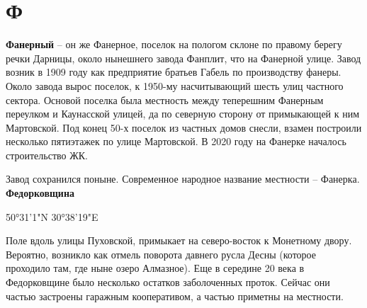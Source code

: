\chapter*{Ф}

\textbf{Фанерный} – он же Фанерное, поселок на пологом склоне по правому берегу речки Дарницы, около нынешнего завода Фанплит, что на Фанерной улице. Завод возник в 1909 году как предприятие братьев Габель по производству фанеры. Около завода вырос поселок, к 1950-му насчитывающий шесть улиц частного сектора. Основой поселка была местность между теперешним Фанерным переулком и Каунасской улицей, да по северную сторону от примыкающей к ним Мартовской. Под конец 50-х поселок из частных домов снесли, взамен построили несколько пятиэтажек по улице Мартовской. В 2020 году на Фанерке началось строительство ЖК.

Завод сохранился поныне. Современное народное название местности – Фанерка.\\

\textbf{Федорковщина}

50°31'1"N 30°38'19"E 

Поле вдоль улицы Пуховской, примыкает на северо-восток к Монетному двору. Вероятно, возникло как отмель поворота давнего русла Десны (которое проходило там, где ныне озеро Алмазное). Еще в середине 20 века в Федорковщине было несколько остатков заболоченных проток. Сейчас они частью застроены гаражным кооперативом, а частью приметны на местности.
